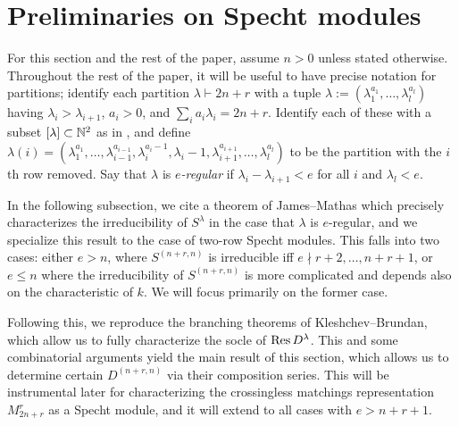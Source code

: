 \documentclass{amsart}
\begin{document}
\section{Preliminaries on Specht modules}\label{Specht Modules Section}
  For this section and the rest of the paper, assume $n > 0$ unless stated otherwise.
  Throughout the rest of the paper, it will be useful to have precise notation for partitions;
  identify each partition $\lambda \vdash 2n + r$ with a tuple $\lambda := (\lambda_1^{a_1},\dots,\lambda_l^{a_l})$ having $\lambda_i > \lambda_{i+1}$, $a_i > 0$, and $\sum_i a_i\lambda_i = 2n + r$.
  Identify each of these with a subset $\left[ \lambda \right] \subset \mathbb{N}^2$ as in \cite{Kleshchev}, and define $\lambda(i) = (\lambda_1^{a_1},\dots,\lambda_{i-1}^{a_{i-1}},\lambda_i^{a_i - 1},\lambda_i-1,\lambda_{i+1}^{a_{i+1}},\dots,\lambda_l^{a_l})$ to be the partition with the $i$th row removed.
  Say that $\lambda$ is \emph{$e$-regular} if $\lambda_i - \lambda_{i+1} < e$ for all $i$ and $\lambda_l < e$.

  In the following subsection, we cite a theorem of James--Mathas which precisely characterizes the irreducibility of $S^\lambda$ in the case that $\lambda$ is $e$-regular, and we specialize this result to the case of two-row Specht modules.
  This falls into two cases: either $e > n$, where $S^{(n+r,n)}$ is irreducible iff $e \nmid r+2,\dots,n+r+1$, or $e \leq n$ where the irreducibility of $S^{(n+r,n)}$ is more complicated and depends also on the characteristic of $k$.
  We will focus primarily on the former case.

  Following this, we reproduce the branching theorems of Kleshchev--Brundan, which allow us to fully characterize the socle of $\operatorname{Res} D^{\lambda}$.
  This and some combinatorial arguments yield the main result of this section, which allows us to determine certain $D^{(n+r,n)}$ via their composition series.
  This will be instrumental later for characterizing the crossingless matchings representation $M_{2n + r}^r$ as a Specht module, and it will extend to all cases with $e > n + r + 1$.
\end{document}
